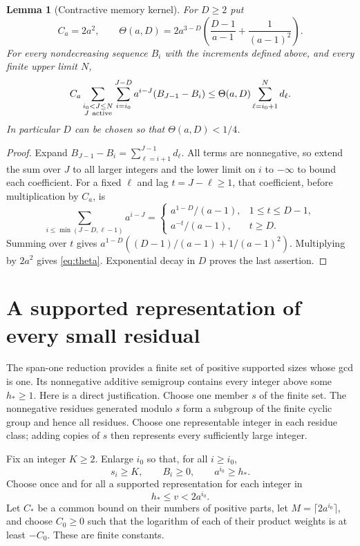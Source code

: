 \documentclass[11pt]{article}
\newtheorem{lemma}[theorem]{Lemma}
\theoremstyle{remark}\newtheorem{remark}[theorem]{Remark}
\begin{document}
\begin{lemma}[Contractive memory kernel]\label{lem:kernel}
For $D\ge2$ put
\begin{equation}\label{eq:theta}
 C_a=2a^2,\qquad
 \Theta(a,D)=2a^{3-D}
 \left(\frac{D-1}{a-1}+\frac{1}{(a-1)^2}\right).
\end{equation}
For every nondecreasing sequence $B_i$ with the increments defined above,
and every finite upper limit $N$,
\begin{equation}\label{eq:kernelsum}
 C_a\sum_{\substack{i_0<J\le N\\J\ {\rm active}}}
       \sum_{i=i_0}^{J-D}a^{i-J}(B_{J-1}-B_i)
 \le\Theta(a,D)\sum_{\ell=i_0+1}^{N}d_\ell.
\end{equation}
In particular $D$ can be chosen so that $\Theta(a,D)<1/4$.
\end{lemma}

\begin{proof}
Expand $B_{J-1}-B_i=\sum_{\ell=i+1}^{J-1}d_\ell$. All terms are
nonnegative, so extend the sum over $J$ to all larger integers and the
lower limit on $i$ to $-\infty$ to bound each coefficient. For a fixed
$\ell$ and lag $t=J-\ell\ge1$, that coefficient, before multiplication by
$C_a$, is
\[
 \sum_{i\le\min(J-D,\ell-1)}a^{i-J}
 =\begin{cases}
  a^{1-D}/(a-1),&1\le t\le D-1,\\
  a^{-t}/(a-1),&t\ge D.
 \end{cases}
\]
Summing over $t$ gives
$a^{1-D}((D-1)/(a-1)+1/(a-1)^2)$. Multiplying by $2a^2$ gives
\eqref{eq:theta}. Exponential decay in $D$ proves the last assertion.
\end{proof}

\section{A supported representation of every small residual}
The span-one reduction provides a finite set of positive supported sizes
whose gcd is one. Its nonnegative additive semigroup contains every integer
above some $h_*\ge1$. Here is a direct justification. Choose one member
$s$ of the finite set. The nonnegative residues generated modulo $s$ form
a subgroup of the finite cyclic group and hence all residues. Choose one
representable integer in each residue class; adding copies of $s$ then
represents every sufficiently large integer.

Fix an integer $K\ge2$. Enlarge $i_0$ so that, for all $i\ge i_0$,
\begin{equation}\label{eq:start}
 s_i\ge K,\qquad B_i\ge0,\qquad a^{i_0}\ge h_*.
\end{equation}
Choose once and for all a supported representation for each integer in
\[
 h_*\le v<2a^{i_0}.
\]
Let $C_*$ be a common bound on their numbers of positive parts, let
$M=\lceil2a^{i_0}\rceil$, and choose $C_0\ge0$ such that the logarithm of
each of their product weights is at least $-C_0$. These are finite constants.
\end{document}
